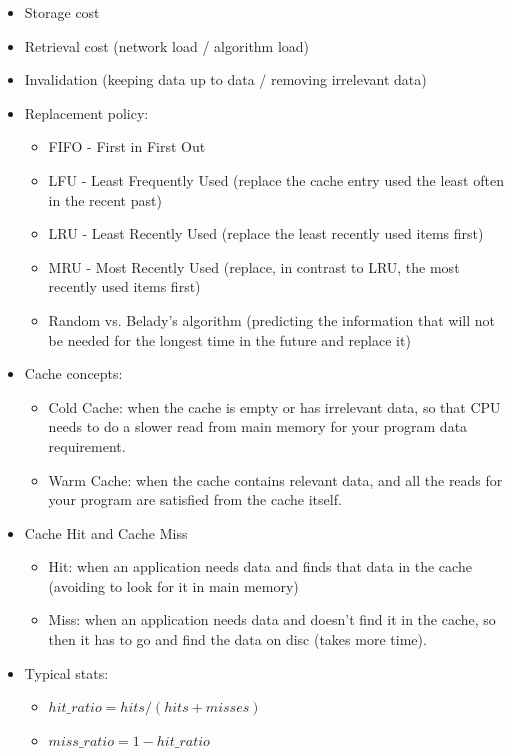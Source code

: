 \documentclass[10pt,a4paper]{article}
\begin{document}
\begin{itemize}
	\item Storage cost
	\item Retrieval cost (network load / algorithm load)
	\item Invalidation (keeping data up to data / removing irrelevant data)
	\item Replacement policy:
	\begin{itemize}
		\item FIFO - First in First Out
		\item LFU - Least Frequently Used (replace the cache entry used the least often in the recent past)
		\item LRU - Least Recently Used (replace the least recently used items first)
		\item MRU - Most Recently Used (replace, in contrast to LRU, the most recently used items first)
		\item Random vs. Belady's algorithm (predicting the information that will not be needed for the longest time in the future and replace it)
	\end{itemize}	 
	\item Cache concepts:
	\begin{itemize}
		\item Cold Cache: when the cache is empty or has irrelevant data, so that CPU needs to do a slower read from main memory for your program data requirement. 
		\item Warm Cache: when the cache contains relevant data, and all the reads for your program are satisfied from the cache itself.
	\end{itemize}
	\item Cache Hit and Cache Miss
	\begin{itemize}
		\item Hit: when an application needs data and finds that data in the cache (avoiding to look for it in main memory)
		\item Miss:  when an application needs data and doesn’t find it in the cache, so then it has to go and find the data on disc (takes more time).
	\end{itemize}
	\item Typical stats:
	\begin{itemize}
		\item $hit\_ratio = hits / (hits + misses)$
		\item $miss\_ratio = 1-hit\_ratio$
	\end{itemize}
\end{itemize}
\end{document}
